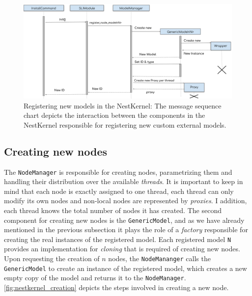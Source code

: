 \vspace{0.5cm}
\begin{figure}[ht!]
\centering
\includegraphics[width=\textwidth]{src/pic/register.png}
\caption{Registering new models in the NestKernel: The message sequence chart depicts the interaction between the components in the NestKernel responsible for registering new custom external models.}
\label{fig:nestkernel_register}
\end{figure}

\subsection{Creating new nodes}

The \texttt{NodeManager} is responsible for creating nodes, parametrizing them and handling their distribution over the available \emph{threads}. It is important to keep in mind that each node is exactly assigned to one thread, each thread can only modify its own nodes and non-local nodes are represented by \emph{proxies}. I addition, each thread knows the total number of nodes it has created. The second component for creating new nodes is the \texttt{GenericModel}, and as we have already mentioned in the previous subsection it plays the role of a \emph{factory} responsible for creating the real instances of the registered model. Each registered model \texttt{N} provides an implementation for \emph{cloning} that is required of creating new nodes. Upon requesting the creation of $n$ nodes, the \texttt{NodeMananger} calls the \texttt{GenericModel} to create an instance of the registered model, which creates a new empty copy of the model and returns it to the \texttt{NodeManager}. \autoref{fig:nestkernel_creation} depicts the steps involved in creating a new node.

